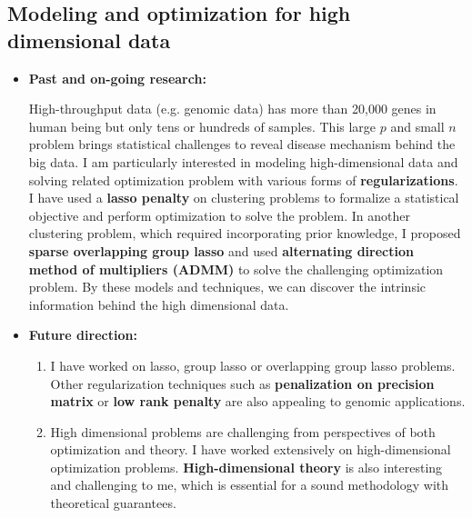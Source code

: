 \documentclass[a4paper, 10pt]{article}
\begin{document}
\subsection{Modeling and optimization for high dimensional data}
\begin{itemize}
\item \textbf{Past and on-going research:}

High-throughput data (e.g. genomic data) has more than 20,000 genes in human being but only tens or hundreds of samples.
This large $p$ and small $n$ problem brings statistical challenges to reveal disease mechanism behind the big data.
I am particularly interested in modeling high-dimensional data and solving related optimization problem with various forms of \textbf{regularizations}.
I have used a \textbf{lasso penalty} on clustering problems to formalize a statistical objective and perform optimization to solve the problem\cite{ref:MSKM}.
In another clustering problem, which required incorporating prior knowledge, 
I proposed \textbf{sparse overlapping group lasso} and used \textbf{alternating direction method of multipliers (ADMM)} to solve the challenging optimization problem\cite{ref:ISKmeans}.
By these models and techniques, we can discover the intrinsic information behind the high dimensional data.

\item \textbf{Future direction:}
\begin{enumerate}
\item I have worked on lasso, group lasso or overlapping group lasso problems.
Other regularization techniques such as \textbf{penalization on precision matrix} or \textbf{low rank penalty} are also appealing to genomic applications.
\item High dimensional problems are challenging from perspectives of both optimization and theory.
I have worked extensively on high-dimensional optimization problems.
\textbf{High-dimensional theory} is also interesting and challenging to me, which is essential for a  sound methodology with theoretical guarantees. 
\end{enumerate}

\end{itemize}
\end{document}

